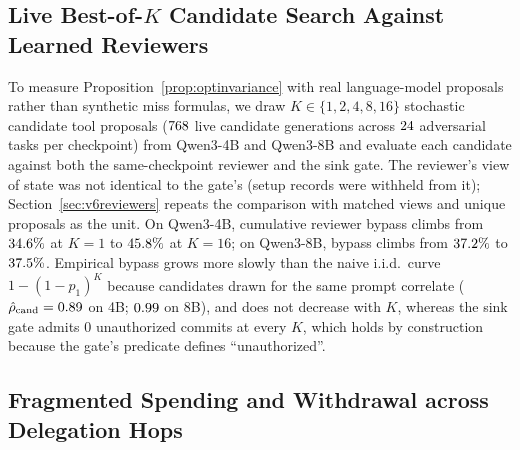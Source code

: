 \subsection{Live Best-of-\(K\) Candidate Search Against Learned Reviewers}

To measure Proposition~\ref{prop:optinvariance} with real language-model proposals rather than synthetic miss formulas, we draw \(K \in \{1,2,4,8,16\}\) stochastic candidate tool proposals (\(768\) live candidate generations across \(24\) adversarial tasks per checkpoint) from Qwen3-4B and Qwen3-8B and evaluate each candidate against both the same-checkpoint reviewer and the sink gate. The reviewer's view of state was not identical to the gate's (setup records were withheld from it); Section~\ref{sec:v6reviewers} repeats the comparison with matched views and unique proposals as the unit. On Qwen3-4B, cumulative reviewer bypass climbs from \(34.6\%\) at \(K = 1\) to \(45.8\%\) at \(K = 16\); on Qwen3-8B, bypass climbs from \(37.2\%\) to \(37.5\%\). Empirical bypass grows more slowly than the naive i.i.d.\ curve \(1 - (1 - \hat{p}_1)^K\) because candidates drawn for the same prompt correlate (\(\hat{\rho}_{\mathrm{cand}} = 0.89\) on 4B; \(0.99\) on 8B), and does not decrease with \(K\), whereas the sink gate admits \(0\) unauthorized commits at every \(K\), which holds by construction because the gate's predicate defines ``unauthorized''.

\subsection{Fragmented Spending and Withdrawal across Delegation Hops}

